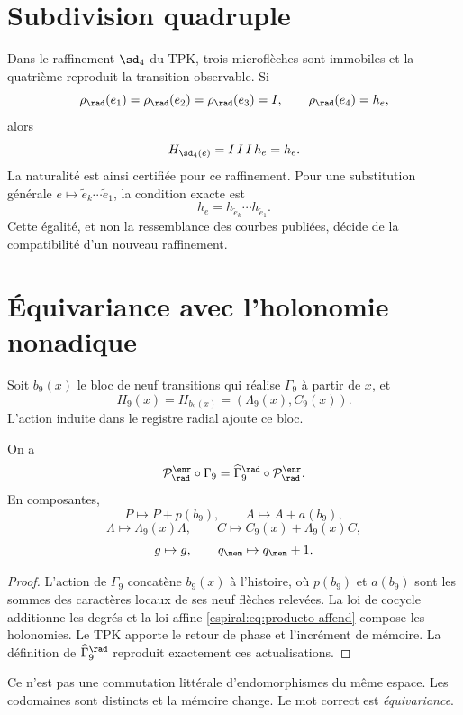 \section{Subdivision quadruple}

Dans le raffinement \(\sd_4\) du TPK, trois microflèches sont immobiles et la quatrième reproduit la transition observable. Si
\[
 \rho_{\rad}(e_1)=\rho_{\rad}(e_2)=\rho_{\rad}(e_3)=I,
 \qquad \rho_{\rad}(e_4)=h_e,
\]
alors
\[
 H_{\sd_4(e)}=I\,I\,I\,h_e=h_e.
\]
La naturalité est ainsi certifiée pour ce raffinement. Pour une substitution générale \(e\mapsto\widetilde e_k\cdots\widetilde e_1\), la condition exacte est
\[
 h_e=h_{\widetilde e_k}\cdots h_{\widetilde e_1}.
\]
Cette égalité, et non la ressemblance des courbes publiées, décide de la compatibilité d'un nouveau raffinement.

\section{Équivariance avec l'holonomie nonadique}

Soit \(b_9(x)\) le bloc de neuf transitions qui réalise \(\Gamma_9\) à partir de \(x\), et
\[
 H_9(x)=H_{b_9(x)}=(\Lambda_9(x),C_9(x)).
\]
L'action induite dans le registre radial ajoute ce bloc.

\begin{theorem}
On a
\begin{equation}
 \mathcal P_{\rad}^{\enr}\circ\Gamma_9
 =\widehat\Gamma_9^{\rad}\circ
 \mathcal P_{\rad}^{\enr}.
 \label{espiral:eq:equivarianza-gamma9}
\end{equation}
En composantes,
\[
 P\mapsto P+p(b_9),
 \qquad
 A\mapsto A+a(b_9),
\]
\[
 \Lambda\mapsto\Lambda_9(x)\Lambda,
 \qquad
 C\mapsto C_9(x)+\Lambda_9(x)C,
\]
\[
 g\mapsto g,\qquad q_{\mem}\mapsto q_{\mem}+1.
\]
\end{theorem}
\begin{proof}
L'action de \(\Gamma_9\) concatène \(b_9(x)\) à l'histoire, où \(p(b_9)\) et \(a(b_9)\) sont les sommes des caractères locaux de ses neuf flèches relevées. La loi de cocycle additionne les degrés et la loi affine \cref{espiral:eq:producto-affend} compose les holonomies. Le TPK apporte le retour de phase et l'incrément de mémoire. La définition de \(\widehat\Gamma_9^{\rad}\) reproduit exactement ces actualisations.
\end{proof}

Ce n'est pas une commutation littérale d'endomorphismes du même espace. Les codomaines sont distincts et la mémoire change. Le mot correct est \emph{équivariance}.

